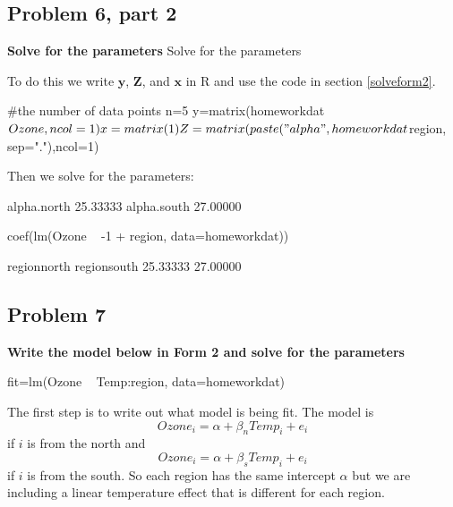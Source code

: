 \subsection*{Problem 6, part 2}
{\bf Solve for the parameters} 
Solve for the parameters

To do this we write $\mathbf{y}$, $\mathbf{Z}$, and $\mathbf{x}$ in R and use the code in section \ref{solveform2}.

\begin{Schunk}
\begin{Sinput}
 #the number of data points
 n=5
 y=matrix(homeworkdat$Ozone, ncol=1)
 x=matrix(1)
 Z=matrix(paste("alpha",homeworkdat$region, sep="."),ncol=1)
\end{Sinput}
\end{Schunk}

Then we solve for the parameters:
\begin{Schunk}
\begin{Soutput}
                [,1]
alpha.north 25.33333
alpha.south 27.00000
\end{Soutput}
\begin{Sinput}
 coef(lm(Ozone ~ -1 + region, data=homeworkdat))
\end{Sinput}
\begin{Soutput}
regionnorth regionsouth 
   25.33333    27.00000 
\end{Soutput}
\end{Schunk}

\subsection*{Problem 7}
{\bf Write the model below in Form 2 and solve for the parameters} 
\begin{Schunk}
\begin{Sinput}
 fit=lm(Ozone ~ Temp:region, data=homeworkdat)
\end{Sinput}
\end{Schunk}

The first step is to write out what model is being fit.  The model is 
$$ Ozone_i = \alpha + \beta_n Temp_i + e_i$$
if $i$ is from the north and 
$$ Ozone_i = \alpha + \beta_s Temp_i + e_i$$
if $i$ is from the south. So each region has the same intercept $\alpha$ but we are including a linear temperature effect that is different for each region.

